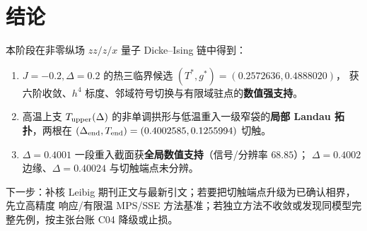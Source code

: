 \documentclass[UTF8,11pt,a4paper]{ctexart}
\begin{document}
\section{结论}

本阶段在非零纵场 $zz/z/x$ 量子 Dicke--Ising 链中得到：

\begin{enumerate}
  \item $J=-0.2,\Delta=0.2$ 的热三临界候选 $(T^\ast,g^\ast)=(0.2572636,0.4888020)$，
        获六阶收敛、$h^4$ 标度、邻域符号切换与有限域驻点的\textbf{数值强支持}。
  \item 高温上支 $T_{\rm upper}(\Delta)$ 的非单调拱形与低温重入一级窄袋的\textbf{局部
        Landau 拓扑}，两根在 $(\Delta_{\rm end},T_{\rm end})=(0.4002585,0.1255994)$ 切触。
  \item $\Delta=0.4001$ 一段重入截面获\textbf{全局数值支持}（信号/分辨率 $68.85$）；
        $\Delta=0.4002$ 边缘、$\Delta=0.40024$ 与切触端点未分辨。
\end{enumerate}

下一步：补核 Leibig 期刊正文与最新引文；若要把切触端点升级为已确认相界，先立高精度
响应/有限温 MPS/SSE 方法基准；若独立方法不收敛或发现同模型完整先例，按主张台账 C04
降级或止损。

\printbibliography[title={参考文献}]
\end{document}
